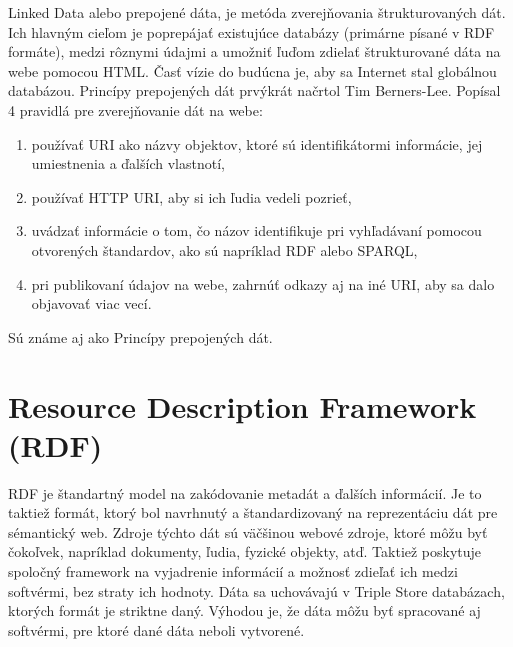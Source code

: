 \documentclass[12pt, a4paper, oneside]{book}
\begin{document}
Linked Data \cite{linkeddata} alebo prepojené dáta, je metóda zverejňovania štrukturovaných dát. Ich hlavným cieľom je poprepájať existujúce databázy (primárne písané v RDF formáte), medzi rôznymi údajmi a umožniť ľuďom zdielať štrukturované dáta na webe pomocou HTML. Časť vízie do budúcna je, aby sa Internet stal globálnou databázou. Princípy prepojených dát prvýkrát načrtol Tim Berners-Lee. Popísal 4 pravidlá pre zverejňovanie dát na webe:
\begin{enumerate}
  \item používať URI ako názvy objektov, ktoré sú identifikátormi informácie, jej umiestnenia a ďalších vlastnotí,
  \item používať HTTP URI, aby si ich ľudia vedeli pozrieť,
  \item uvádzať informácie o tom, čo názov identifikuje pri vyhľadávaní pomocou otvorených štandardov, ako sú napríklad RDF alebo SPARQL,
  \item pri publikovaní údajov na webe, zahrnúť odkazy aj na iné URI, aby sa dalo objavovať viac vecí.
\end{enumerate}
Sú známe aj ako Princípy prepojených dát.



\section{Resource Description Framework (RDF)}

RDF \cite{rdf} je štandartný model na zakódovanie metadát a ďalších informácií. Je to taktiež formát, ktorý bol navrhnutý a štandardizovaný na reprezentáciu dát pre sémantický web. Zdroje týchto dát sú väčšinou webové zdroje, ktoré môžu byť čokoľvek, napríklad dokumenty, ľudia, fyzické objekty, atď. Taktiež poskytuje spoločný framework na vyjadrenie informácií a možnosť zdieľať ich medzi softvérmi, bez straty ich hodnoty. Dáta sa uchovávajú v Triple Store databázach, ktorých formát je striktne daný. Výhodou je, že dáta môžu byť spracované aj softvérmi, pre ktoré dané dáta neboli vytvorené.

\end{document}

